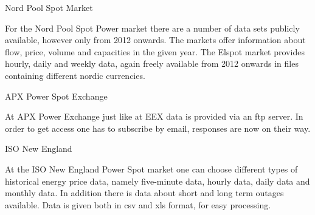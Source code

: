 \documentclass[a4paper]{article}
\begin{document}
\begin{itemize}
	\subitem Nord Pool Spot Market
	
	For the Nord Pool Spot Power market there are a number of data sets publicly available, however only from 2012 onwards. 
	The markets offer information about flow, price, volume and capacities in the given year. The Elspot market provides hourly, daily and weekly data, again freely available from 2012 onwards in files containing different nordic currencies.  

	\subitem APX Power Spot Exchange
	
	At APX Power Exchange just like at EEX data is provided via an ftp server. In order to get access one has to subscribe by email, responses are now on their way. 
	
	\subitem ISO New England
	
	At the ISO New England Power Spot market one can choose different types of historical energy price data, namely five-minute data, hourly data, daily data and monthly data. In addition there is data about short and long term outages available. 
	Data is given both in csv and xls format, for easy processing. 

\end{itemize}
\end{document}
